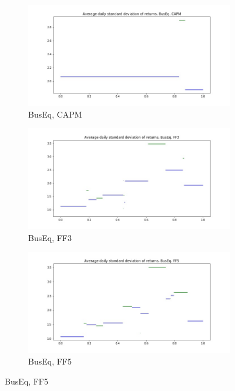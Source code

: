 \documentclass{article}
\begin{document}
 \begin{figure}
  \centering
  \begin{subfigure}[b]{0.3\textwidth}
    \centering
    \includegraphics[width=\textwidth]{BusEq/daily_stdevCAPM.jpg}
    \caption{BusEq, CAPM}
    \label{fig:1}
  \end{subfigure}
  \begin{subfigure}[b]{0.3\textwidth}
    \centering
    \includegraphics[width=\textwidth]{BusEq/daily_stdevFF3.jpg}
    \caption{BusEq, FF3}
    \label{fig:2}
  \end{subfigure}
    \begin{subfigure}[b]{0.3\textwidth}
    \centering
    \includegraphics[width=\textwidth]{BusEq/daily_stdevFF5.jpg}
    \caption{BusEq, FF5}
    \label{fig:1}
  \end{subfigure}
  \end{figure}
\end{document}
